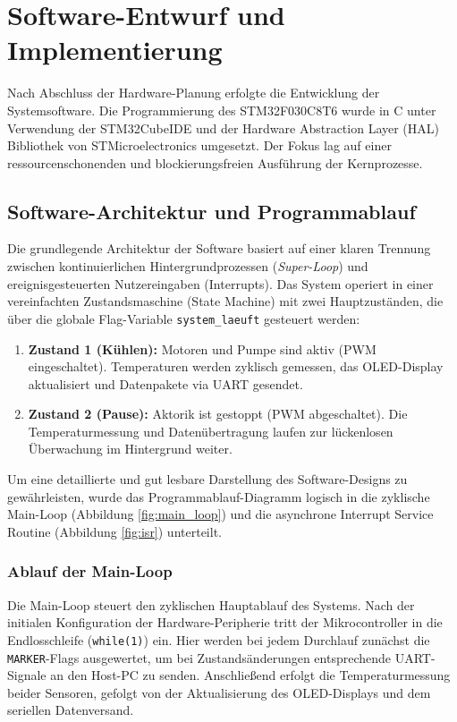 \chapter{Software-Entwurf und Implementierung}
\label{cha:software}

Nach Abschluss der Hardware-Planung erfolgte die Entwicklung der Systemsoftware. Die Programmierung des STM32F030C8T6 wurde in C unter Verwendung der STM32CubeIDE und der Hardware Abstraction Layer (HAL) Bibliothek von STMicroelectronics umgesetzt. Der Fokus lag auf einer ressourcenschonenden und blockierungsfreien Ausführung der Kernprozesse.

\section{Software-Architektur und Programmablauf}
Die grundlegende Architektur der Software basiert auf einer klaren Trennung zwischen kontinuierlichen Hintergrundprozessen (\textit{Super-Loop}) und ereignisgesteuerten Nutzereingaben (Interrupts). Das System operiert in einer vereinfachten Zustandsmaschine (State Machine) mit zwei Hauptzuständen, die über die globale Flag-Variable \texttt{system\_laeuft} gesteuert werden:

\begin{enumerate}
	\item \textbf{Zustand 1 (Kühlen):} Motoren und Pumpe sind aktiv (PWM eingeschaltet). Temperaturen werden zyklisch gemessen, das OLED-Display aktualisiert und Datenpakete via UART gesendet.
	\item \textbf{Zustand 2 (Pause):} Aktorik ist gestoppt (PWM abgeschaltet). Die Temperaturmessung und Datenübertragung laufen zur lückenlosen Überwachung im Hintergrund weiter.
\end{enumerate}

Um eine detaillierte und gut lesbare Darstellung des Software-Designs zu gewährleisten, wurde das Programmablauf-Diagramm logisch in die zyklische Main-Loop (Abbildung \ref{fig:main_loop}) und die asynchrone Interrupt Service Routine (Abbildung \ref{fig:isr}) unterteilt.

\subsection{Ablauf der Main-Loop}
Die Main-Loop steuert den zyklischen Hauptablauf des Systems. Nach der initialen Konfiguration der Hardware-Peripherie tritt der Mikrocontroller in die Endlosschleife (\texttt{while(1)}) ein. Hier werden bei jedem Durchlauf zunächst die \texttt{MARKER}-Flags ausgewertet, um bei Zustandsänderungen entsprechende UART-Signale an den Host-PC zu senden. Anschließend erfolgt die Temperaturmessung beider Sensoren, gefolgt von der Aktualisierung des OLED-Displays und dem seriellen Datenversand.

